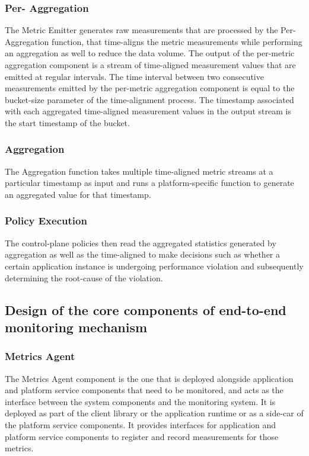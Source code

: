 \subsubsection{Per- Aggregation}
The Metric  Emitter generates raw measurements that are processed by the Per- Aggregation function, that time-aligns the metric measurements while performing an aggregation as well to reduce the data volume. The output of the per-metric aggregation component is a stream of time-aligned measurement values that are emitted at regular intervals. The time interval between two consecutive measurements emitted by the per-metric aggregation component is equal to the bucket-size parameter of the time-alignment process. The timestamp associated with each aggregated time-aligned measurement values in the output stream is the start timestamp of the bucket.

\subsubsection{ Aggregation}
The  Aggregation function takes multiple time-aligned metric streams at a particular timestamp as input and runs a platform-specific function to generate an aggregated value for that timestamp. 

\subsubsection{Policy Execution}
The control-plane policies then read the aggregated statistics generated by  aggregation as well as the time-aligned  to make decisions such as whether a certain application instance is undergoing performance violation and subsequently determining the root-cause of the violation.

\subsection{Design of the core components of end-to-end monitoring mechanism}
\subsubsection{Metrics Agent}
The Metrics Agent component is the one that is deployed alongside application and platform service components that need to be monitored, and acts as the interface between the system components and the monitoring system. It is deployed as part of the client library or the application runtime or as a side-car of the platform service components. It provides interfaces for application and platform service components to register  and record measurements for those metrics. 

